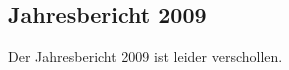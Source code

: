 \subsection{Jahresbericht 2009}

\begin{history}
    Der Jahresbericht 2009 ist leider verschollen.



\end{history}
